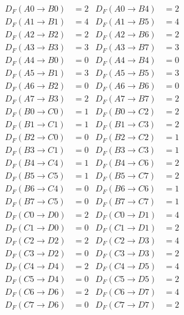 \begin{align}\label{eqn:ConRetiming} 
D_F(A0\to B0)&=2 &  D_F(A0\to B4)&=2 		 \\
D_F(A1\to B1)&=4 &  D_F(A1\to B5)&=4\nonumber\\
D_F(A2\to B2)&=2 &  D_F(A2\to B6)&=2\nonumber\\
D_F(A3\to B3)&=3 &  D_F(A3\to B7)&=3\nonumber\\
D_F(A4\to B0)&=0 &  D_F(A4\to B4)&=0\nonumber\\
D_F(A5\to B1)&=3 &  D_F(A5\to B5)&=3\nonumber\\
D_F(A6\to B2)&=0 &  D_F(A6\to B6)&=0\nonumber\\
D_F(A7\to B3)&=2 &  D_F(A7\to B7)&=2\nonumber\\
D_F(B0\to C0)&=1 &  D_F(B0\to C2)&=2\nonumber\\
D_F(B1\to C1)&=1 &  D_F(B1\to C3)&=2\nonumber\\
D_F(B2\to C0)&=0 &  D_F(B2\to C2)&=1\nonumber\\
D_F(B3\to C1)&=0 &  D_F(B3\to C3)&=1\nonumber\\
D_F(B4\to C4)&=1 &  D_F(B4\to C6)&=2\nonumber\\
D_F(B5\to C5)&=1 &  D_F(B5\to C7)&=2\nonumber\\
D_F(B6\to C4)&=0 &  D_F(B6\to C6)&=1\nonumber\\
D_F(B7\to C5)&=0 &  D_F(B7\to C7)&=1\nonumber\\
D_F(C0\to D0)&=2 &  D_F(C0\to D1)&=4\nonumber\\
D_F(C1\to D0)&=0 &  D_F(C1\to D1)&=2\nonumber\\
D_F(C2\to D2)&=2 &  D_F(C2\to D3)&=4\nonumber\\
D_F(C3\to D2)&=0 &  D_F(C3\to D3)&=2\nonumber\\
D_F(C4\to D4)&=2 &  D_F(C4\to D5)&=4\nonumber\\
D_F(C5\to D4)&=0 &  D_F(C5\to D5)&=2\nonumber\\
D_F(C6\to D6)&=2 &  D_F(C6\to D7)&=4\nonumber\\
D_F(C7\to D6)&=0 &  D_F(C7\to D7)&=2\nonumber
\end{align}
